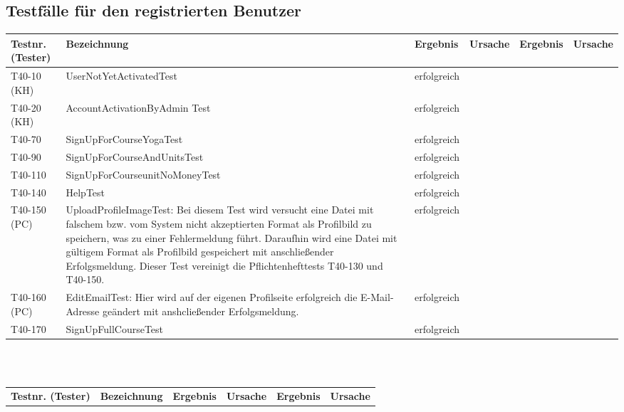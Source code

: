 \begin{landscape}
	\section{Testfälle für den registrierten Benutzer}
		\begin{tabular}{|p{2.0cm} |p{5.0cm}|p{3.0cm}|p{5.0cm}|p{4.0cm}|p{4.0cm}|}
			\hline \textbf{Testnr. (Tester)} & \textbf{Bezeichnung} & \textbf{Ergebnis} & \textbf{Ursache} & \textbf{Ergebnis} & \textbf{Ursache} \\
			\hline T40-10 (KH)  &  UserNotYetActivatedTest        & erfolgreich   &        &         &       \\
			\hline T40-20  (KH) & AccountActivationByAdmin Test  & erfolgreich    &        &         &       \\	
			\hline T40-70   & SignUpForCourseYogaTest & erfolgreich &        &         &       \\	
			\hline T40-90   & SignUpForCourseAndUnitsTest & erfolgreich &        &         &       \\	
			\hline T40-110  & SignUpForCourseunitNoMoneyTest & erfolgreich &        &         &       \\	
			\hline T40-140  & HelpTest & erfolgreich &        &         &       \\	
			
			\hline T40-150 (PC) & UploadProfileImageTest: Bei diesem Test wird versucht eine Datei mit falschem bzw. vom System nicht akzeptierten Format als Profilbild zu speichern, was zu einer Fehlermeldung führt. Daraufhin wird eine Datei mit gültigem Format als Profilbild gespeichert mit anschließender Erfolgsmeldung. Dieser Test vereinigt die Pflichtenhefttests T40-130 und T40-150.	&	erfolgreich & & & \\
			
			\hline T40-160 (PC) & EditEmailTest: Hier wird auf der eigenen Profilseite erfolgreich die E-Mail-Adresse geändert mit anshcließender Erfolgsmeldung. & erfolgreich & & & \\
			
			\hline T40-170  & SignUpFullCourseTest & erfolgreich &        &         &       \\	
			
			\hline 
		\end{tabular} \ \\
		\ \\			
			
			\begin{tabular}{|p{2.0cm} |p{5.0cm}|p{3.0cm}|p{5.0cm}|p{4.0cm}|p{4.0cm}|}
			\hline \textbf{Testnr. (Tester)} & \textbf{Bezeichnung} & \textbf{Ergebnis} & \textbf{Ursache} & \textbf{Ergebnis} & \textbf{Ursache} \\
			

\end{tabular}
\end{landscape}
